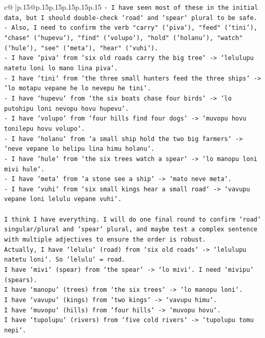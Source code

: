 \documentclass{article}
\begin{document}
{\begin{supertabular}{c@{$\;$}|p{.15\linewidth}@{}p{.15\linewidth}p{.15\linewidth}p{.15\linewidth}p{.15\linewidth}p{.15\linewidth}}
{{{\texttt{{-} I have seen most of these in the initial data, but I should double{-}check `road` and `spear` plural to be safe.} \\
\texttt{{-} Also, I need to confirm the verb "carry" (`piva`), "feed" (`tini`), "chase" (`hupevu`), "find" (`volupo`), "hold" (`holanu`), "watch" (`hule`), "see" (`meta`), "hear" (`vuhi`).} \\
\texttt{{-} I have `piva` from `six old roads carry the big tree` {-}> `lelulupu natetu loni lo mano lina piva`.} \\
\texttt{{-} I have `tini` from `the three small hunters feed the three ships` {-}> `lo motapu vepane he lo nevepu he tini`.} \\
\texttt{{-} I have `hupevu` from `the six boats chase four birds` {-}> `lo putohipu loni nevopu hovu hupevu`.} \\
\texttt{{-} I have `volupo` from `four hills find four dogs` {-}> `muvopu hovu tonilepu hovu volupo`.} \\
\texttt{{-} I have `holanu` from `a small ship hold the two big farmers` {-}> `neve vepane lo helipu lina himu holanu`.} \\
\texttt{{-} I have `hule` from `the six trees watch a spear` {-}> `lo manopu loni mivi hule`.} \\
\texttt{{-} I have `meta` from `a stone see a ship` {-}> `mato neve meta`.} \\
\texttt{{-} I have `vuhi` from `six small kings hear a small road` {-}> `vavupu vepane loni lelulu vepane vuhi`.} \\
\\ 
\texttt{I think I have everything. I will do one final round to confirm `road` singular/plural and `spear` plural, and maybe test a complex sentence with multiple adjectives to ensure the order is robust.} \\
\texttt{Actually, I have `lelulu` (road) from `six old roads` {-}> `lelulupu natetu loni`. So `lelulu` = road.} \\
\texttt{I have `mivi` (spear) from `the spear` {-}> `lo mivi`. I need `mivipu` (spears).} \\
\texttt{I have `manopu` (trees) from `the six trees` {-}> `lo manopu loni`.} \\
\texttt{I have `vavupu` (kings) from `two kings` {-}> `vavupu himu`.} \\
\texttt{I have `muvopu` (hills) from `four hills` {-}> `muvopu hovu`.} \\
\texttt{I have `tupolupu` (rivers) from `five cold rivers` {-}> `tupolupu tomu nepi`.} \\
}}}
\end{supertabular}}
\end{document}

